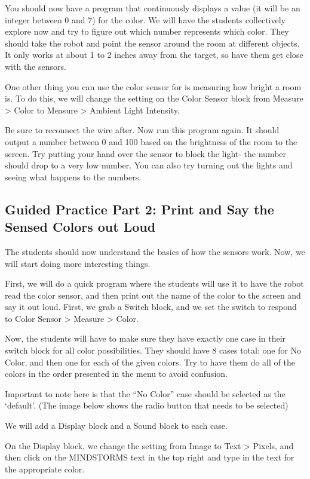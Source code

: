\documentclass{lessonplan}
\begin{document}
        You should now have a program that continuously displays a value (it will be an integer between 0 and 7) for the color. We will have the students collectively explore now and try to figure out which number represents which color. They should take the robot and point the sensor around the room at different objects. It only works at about 1 to 2 inches away from the target, so have them get close with the sensors.
        \par
        One other thing you can use the color sensor for is measuring how bright a room is. To do this, we will change the setting on the Color Sensor block from Measure > Color to Measure > Ambient Light Intensity. 
        \par
        Be sure to reconnect the wire after. Now run this program again. It should output a number between 0 and 100 based on the brightness of the room to the screen. Try putting your hand over the sensor to block the light- the number should drop to a very low number. You can also try turning out the lights and seeing what happens to the numbers. 
    \subsection{Guided Practice Part 2: Print and Say the Sensed Colors out Loud}
        The students should now understand the basics of how the sensors work. Now, we will start doing more interesting things.
        \par
        First, we will do a quick program where the students will use it to have the robot read the color sensor, and then print out the name of the color to the screen and say it out loud. First, we grab a Switch block, and we set the switch to respond to Color Sensor > Measure > Color. 
        
        
        Now, the students will have to make sure they have exactly one case in their switch block for all color possibilities. They should have 8 cases total: one for No Color, and then one for each of the given colors. Try to have them do all of the colors in the order presented in the menu to avoid confusion.
        \par
        Important to note here is that the “No Color” case should be selected as the ‘default’. (The image below shows the radio button that needs to be selected)
        \par
        We will add a Display block and a Sound block to each case.
        \par
        On the Display block, we change the setting from Image to Text > Pixels, and then click on the MINDSTORMS text in the top right and type in the text for the appropriate color.
        
\end{document}

